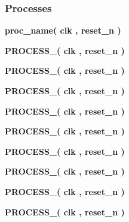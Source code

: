 \subsubsection*{Processes}
 \begin{DoxyCompactItemize}
\item 
{\bf proc\+\_\+name}{\bfseries  ( {\bfseries {\bfseries {\bf clk}} \textcolor{vhdlchar}{ }} , {\bfseries {\bfseries {\bf reset\+\_\+n}} \textcolor{vhdlchar}{ }} )}
\item 
{\bf P\+R\+O\+C\+E\+S\+S\+\_}{\bfseries  ( {\bfseries {\bfseries {\bf clk}} \textcolor{vhdlchar}{ }} , {\bfseries {\bfseries {\bf reset\+\_\+n}} \textcolor{vhdlchar}{ }} )}
\item 
{\bf P\+R\+O\+C\+E\+S\+S\+\_}{\bfseries  ( {\bfseries {\bfseries {\bf clk}} \textcolor{vhdlchar}{ }} , {\bfseries {\bfseries {\bf reset\+\_\+n}} \textcolor{vhdlchar}{ }} )}
\item 
{\bf P\+R\+O\+C\+E\+S\+S\+\_}{\bfseries  ( {\bfseries {\bfseries {\bf clk}} \textcolor{vhdlchar}{ }} , {\bfseries {\bfseries {\bf reset\+\_\+n}} \textcolor{vhdlchar}{ }} )}
\item 
{\bf P\+R\+O\+C\+E\+S\+S\+\_}{\bfseries  ( {\bfseries {\bfseries {\bf clk}} \textcolor{vhdlchar}{ }} , {\bfseries {\bfseries {\bf reset\+\_\+n}} \textcolor{vhdlchar}{ }} )}
\item 
{\bf P\+R\+O\+C\+E\+S\+S\+\_}{\bfseries  ( {\bfseries {\bfseries {\bf clk}} \textcolor{vhdlchar}{ }} , {\bfseries {\bfseries {\bf reset\+\_\+n}} \textcolor{vhdlchar}{ }} )}
\item 
{\bf P\+R\+O\+C\+E\+S\+S\+\_}{\bfseries  ( {\bfseries {\bfseries {\bf clk}} \textcolor{vhdlchar}{ }} , {\bfseries {\bfseries {\bf reset\+\_\+n}} \textcolor{vhdlchar}{ }} )}
\item 
{\bf P\+R\+O\+C\+E\+S\+S\+\_}{\bfseries  ( {\bfseries {\bfseries {\bf clk}} \textcolor{vhdlchar}{ }} , {\bfseries {\bfseries {\bf reset\+\_\+n}} \textcolor{vhdlchar}{ }} )}
\item 
{\bf P\+R\+O\+C\+E\+S\+S\+\_}{\bfseries  ( {\bfseries {\bfseries {\bf clk}} \textcolor{vhdlchar}{ }} , {\bfseries {\bfseries {\bf reset\+\_\+n}} \textcolor{vhdlchar}{ }} )}
\item 
{\bf P\+R\+O\+C\+E\+S\+S\+\_}{\bfseries  ( {\bfseries {\bfseries {\bf clk}} \textcolor{vhdlchar}{ }} , {\bfseries {\bfseries {\bf reset\+\_\+n}} \textcolor{vhdlchar}{ }} )}
\end{DoxyCompactItemize}
